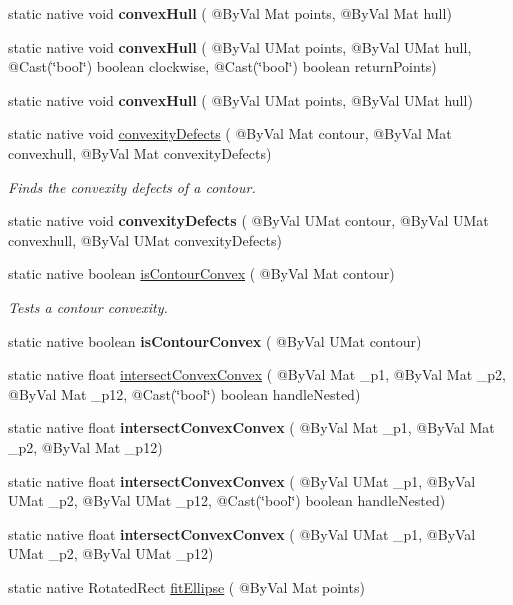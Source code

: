\begin{DoxyCompactItemize}
static native void {\bfseries convex\+Hull} ( @By\+Val Mat points, @By\+Val Mat hull)
\item 
static native void {\bfseries convex\+Hull} ( @By\+Val U\+Mat points, @By\+Val U\+Mat hull, @Cast(\char`\"{}bool\char`\"{}) boolean clockwise, @Cast(\char`\"{}bool\char`\"{}) boolean return\+Points)
\item 
static native void {\bfseries convex\+Hull} ( @By\+Val U\+Mat points, @By\+Val U\+Mat hull)
\item 
static native void \hyperlink{group__imgproc__shape_ga5947a188964bc225faa41c8281dd16a4}{convexity\+Defects} ( @By\+Val Mat contour, @By\+Val Mat convexhull, @By\+Val Mat convexity\+Defects)
\begin{DoxyCompactList}\small\item\em Finds the convexity defects of a contour. \end{DoxyCompactList}\item 
static native void {\bfseries convexity\+Defects} ( @By\+Val U\+Mat contour, @By\+Val U\+Mat convexhull, @By\+Val U\+Mat convexity\+Defects)
\item 
static native boolean \hyperlink{group__imgproc__shape_gad00ac2d87b83a753b5edcdbb2daf526f}{is\+Contour\+Convex} ( @By\+Val Mat contour)
\begin{DoxyCompactList}\small\item\em Tests a contour convexity. \end{DoxyCompactList}\item 
static native boolean {\bfseries is\+Contour\+Convex} ( @By\+Val U\+Mat contour)
\item 
static native float \hyperlink{group__imgproc__shape_ga1664076df6a9c8e2780c3650b12551a1}{intersect\+Convex\+Convex} ( @By\+Val Mat \+\_\+p1, @By\+Val Mat \+\_\+p2, @By\+Val Mat \+\_\+p12, @Cast(\char`\"{}bool\char`\"{}) boolean handle\+Nested)
\item 
static native float {\bfseries intersect\+Convex\+Convex} ( @By\+Val Mat \+\_\+p1, @By\+Val Mat \+\_\+p2, @By\+Val Mat \+\_\+p12)
\item 
static native float {\bfseries intersect\+Convex\+Convex} ( @By\+Val U\+Mat \+\_\+p1, @By\+Val U\+Mat \+\_\+p2, @By\+Val U\+Mat \+\_\+p12, @Cast(\char`\"{}bool\char`\"{}) boolean handle\+Nested)
\item 
static native float {\bfseries intersect\+Convex\+Convex} ( @By\+Val U\+Mat \+\_\+p1, @By\+Val U\+Mat \+\_\+p2, @By\+Val U\+Mat \+\_\+p12)
\item 
static native Rotated\+Rect \hyperlink{group__imgproc__shape_ga4e705f42eefa1224c87285653b6fb44d}{fit\+Ellipse} ( @By\+Val Mat points)

\end{DoxyCompactItemize}
